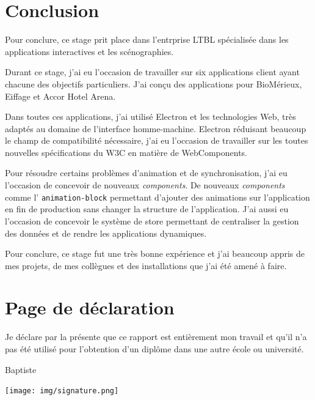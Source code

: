\documentclass{article}
\newcommand{\components}{\emph{components}\xspace}
\begin{document}
    \clearpage

    \section{Conclusion}

    Pour conclure, ce stage prit place dans l'entrprise LTBL spécialisée dans les applications interactives et les scénographies.

    Durant ce stage, j'ai eu l'occasion de travailler sur six applications client ayant chacune des objectifs particuliers.
    J'ai conçu des applications pour BioMérieux, Eiffage et Accor Hotel Arena.

    Dans toutes ces applications, j'ai utilisé Electron et les technologies Web, très adaptés au domaine de l'interface homme-machine.
    Electron réduisant beaucoup le champ de compatibilité nécessaire, j'ai eu l'occasion de travailler sur les toutes nouvelles spécifications du W3C en matière de WebComponents.

    Pour résoudre certains problèmes d'animation et de synchronisation, j'ai eu l'occasion de concevoir de nouveaux \components.
    De nouveaux \components comme l’ \texttt{animation-block} permettant d'ajouter des animations sur l'application en fin de production sans changer la structure de l'application.
    J'ai aussi eu l'occasion de concevoir le système de store permettant de centraliser la gestion des données et de rendre les applications dynamiques.

    Pour conclure, ce stage fut une très bonne expérience et j'ai beaucoup appris de mes projets, de mes collègues et des installations que j'ai été amené à faire.

    \clearpage

    \section{Page de déclaration}

    \vspace{\fill}

    Je déclare par la présente que ce rapport est entièrement mon travail et qu'il n'a pas été utilisé pour l'obtention d'un diplôme dans une autre école ou université.

    \vspace{3cm}

    \hspace{\fill}Baptiste 

    \hspace{\fill}\texttt{[image: img/signature.png]}

    \vspace{\fill}
\end{document}
